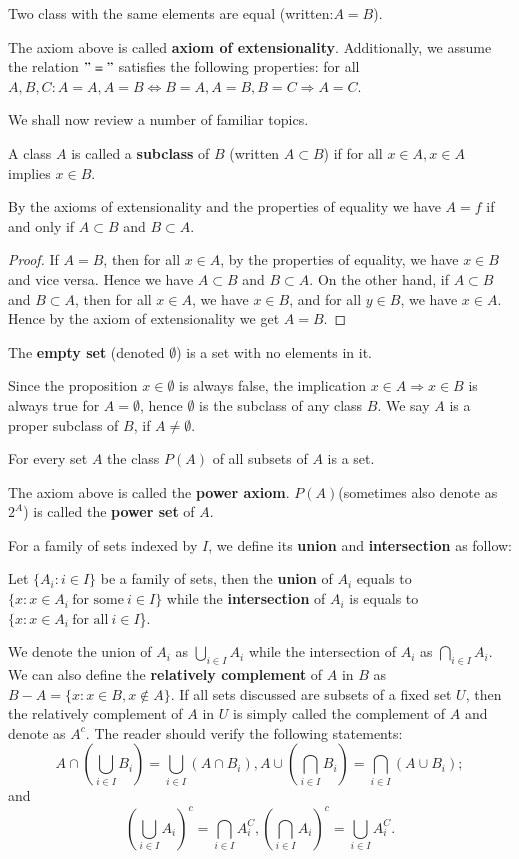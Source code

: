 \begin{axiom}
Two class with the same elements are equal (written:$A=B$).
\end{axiom}
The axiom above is called \textbf{axiom of extensionality}. Additionally, we assume the relation $"="$ satisfies the following properties: for all $A,B,C:A=A,A=B \Leftrightarrow B=A,A=B,B=C\Rightarrow A=C$.\par
We shall now review a number of familiar topics.
\begin{definition}
A class $A$ is called a \textbf{subclass} of $B$ (written $A\subset B$) if for all $x\in A,x\in A$ implies $x\in B$.
\end{definition}
By the axioms of extensionality and the properties of equality we have $A=f$ if and only if $A\subset B$ and $B\subset A$.
\begin{proof}
If $A=B$, then for all $x\in A$, by the properties of equality, we have $x\in B$ and vice versa. Hence we have $A\subset B$ and $B\subset A$. On the other hand, if $A\subset B$ and $B\subset A$, then for all $x\in A$, we have $x\in B$, and for all $y\in B$, we have $x\in A$. Hence by the axiom of extensionality we get $A=B$.
\end{proof}
\begin{definition}
The \textbf{empty set} (denoted $\emptyset$) is a set with no elements in it.
\end{definition}
Since the proposition $x\in\emptyset$ is always false, the implication $x\in A\Rightarrow x\in B$ is always true for $A=\emptyset$, hence $\emptyset$ is the subclass of any class $B$. We say $A$ is a proper subclass of $B$, if $A\ne\emptyset$.
\begin{axiom}
For every set $A$ the class $P(A)$ of all subsets of $A$ is a set.
\end{axiom}
The axiom above is called the \textbf{power axiom}. $P(A)$(sometimes also denote as $2^A$) is called the \textbf{power set} of $A$.\par
For a family of sets indexed by $I$, we define its \textbf{union} and \textbf{intersection} as follow:
\begin{definition}
Let $\{A_i:i\in I\}$ be a family of sets, then the \textbf{union} of $A_i$ equals to $\{x:x\in A_i\  \text{for some}\  i\in I\}$ while the \textbf{intersection} of $A_i$ is equals to $\{x:x\in A_i\  \text{for all}\  i\in I$\}.
\end{definition}
We denote the union of $A_i$ as $\bigcup_{i\in I}A_i$ while the intersection of $A_i$ as $\bigcap_{i\in I}A_i$. We can also define the \textbf{relatively complement} of $A$ in $B$ as $B-A=\{x:x\in B,x\notin A\}$. If all sets discussed are subsets of a fixed set $U$, then the relatively complement of $A$ in $U$ is simply called the complement of $A$ and denote as $A^c$. The reader should verify the following statements:
$$
A\cap \left( \bigcup_{i\in I}{B_i} \right) =\bigcup_{i\in I}{\left( A\cap B_i \right)},A\cup \left( \bigcap_{i\in I}{B_i} \right) =\bigcap_{i\in I}{\left( A\cup B_i \right)};
$$
and
$$
\left( \bigcup_{i\in I}{A_i} \right) ^c=\bigcap_{i\in I}{A_{i}^{C}},\left( \bigcap_{i\in I}{A_i} \right) ^c=\bigcup_{i\in I}{A_{i}^{C}}.
$$
